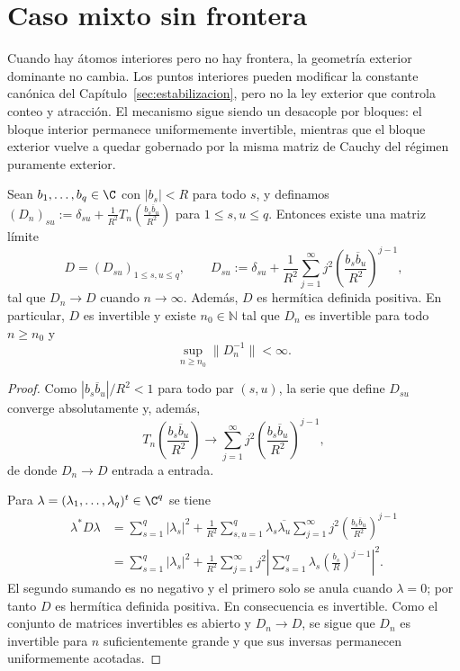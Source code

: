 \section{Caso mixto sin frontera}

Cuando hay átomos interiores pero no hay frontera, la geometría exterior dominante no cambia. Los puntos interiores pueden modificar la constante canónica del Capítulo~\ref{sec:estabilizacion}, pero no la ley exterior que controla conteo y atracción. El mecanismo sigue siendo un desacople por bloques: el bloque interior permanece uniformemente invertible, mientras que el bloque exterior vuelve a quedar gobernado por la misma matriz de Cauchy del régimen puramente exterior.

\begin{lem}\label{lem:bloque_interior_invertible}
	Sean $b_1,\dots,b_q\in\C$ con $|b_s|<R$ para todo $s$, y definamos $(D_n)_{su}:=\delta_{su}+\frac1{R^2}T_n\!\left(\frac{b_s\overline b_u}{R^2}\right)$ para $1\le s,u\le q$.
	Entonces existe una matriz límite
	\[
		D=(D_{su})_{1\le s,u\le q},
		\qquad
		D_{su}:=\delta_{su}+\frac1{R^2}\sum_{j=1}^{\infty} j^2\left(\frac{b_s\overline b_u}{R^2}\right)^{j-1},
	\]
	tal que $D_n\to D$ cuando $n\to\infty$. Además, $D$ es hermítica definida positiva. En particular, $D$ es invertible y existe $n_0\in\mathbb{N}$ tal que $D_n$ es invertible para todo $n\ge n_0$ y
	\[
		\sup_{n\ge n_0}\|D_n^{-1}\|<\infty.
	\]
\end{lem}

\begin{proof}
	Como $|b_s\overline b_u|/R^2<1$ para todo par $(s,u)$, la serie que define $D_{su}$ converge absolutamente y, además,
	\[
		T_n\!\left(\frac{b_s\overline b_u}{R^2}\right)
		\longrightarrow
		\sum_{j=1}^{\infty} j^2\left(\frac{b_s\overline b_u}{R^2}\right)^{j-1},
	\]
	de donde $D_n\to D$ entrada a entrada.

	Para $\lambda=(\lambda_1,\dots,\lambda_q)^t\in\C^q$ se tiene
	\begin{align*}
		\lambda^*D\lambda
		 & =\sum_{s=1}^q |\lambda_s|^2
		+\frac1{R^2}\sum_{s,u=1}^q \lambda_s\overline{\lambda_u}
		\sum_{j=1}^{\infty} j^2\left(\frac{b_s\overline b_u}{R^2}\right)^{j-1} \\
		 & =\sum_{s=1}^q |\lambda_s|^2
		+\frac1{R^2}\sum_{j=1}^{\infty} j^2
		\left|\sum_{s=1}^q \lambda_s\left(\frac{b_s}{R}\right)^{j-1}\right|^2.
	\end{align*}
	El segundo sumando es no negativo y el primero solo se anula cuando $\lambda=0$; por tanto $D$ es hermítica definida positiva. En consecuencia es invertible. Como el conjunto de matrices invertibles es abierto y $D_n\to D$, se sigue que $D_n$ es invertible para $n$ suficientemente grande y que sus inversas permanecen uniformemente acotadas.
\end{proof}

